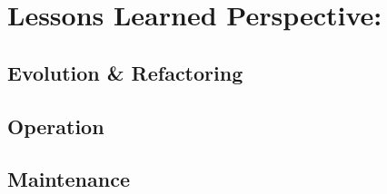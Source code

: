 \section{Lessons Learned Perspective:}

\subsection{Evolution \& Refactoring}
%
%



\subsection{Operation}
%
%

\subsection{Maintenance}
%
%


